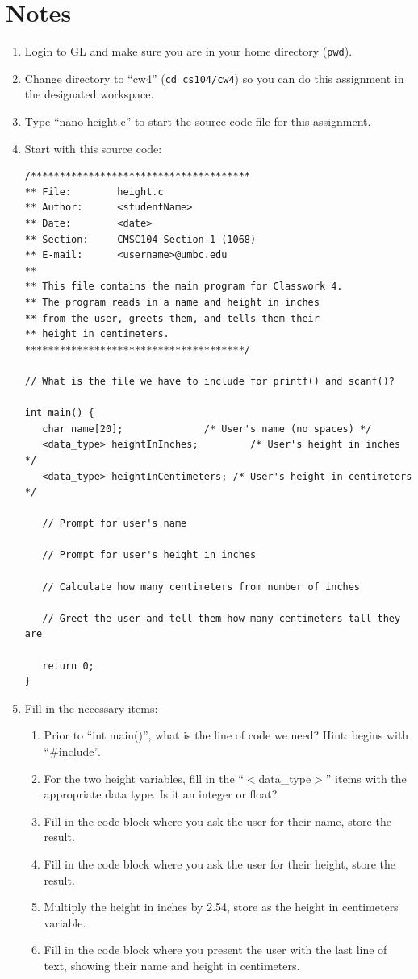 \documentclass[letter,11pt]{article}
\begin{document}
\section*{Notes}
\begin{enumerate}
    \item Login to GL and make sure you are in your home directory (\texttt{pwd}).
    \item Change directory to ``cw4'' (\texttt{cd cs104/cw4}) so you can do this assignment in the designated workspace.
    \item Type ``nano height.c'' to start the source code file for this assignment.
    \item Start with this source code: 
    \begin{verbatim}
/**************************************
** File:        height.c
** Author:      <studentName>
** Date:        <date>
** Section:     CMSC104 Section 1 (1068)
** E-mail:      <username>@umbc.edu
**
** This file contains the main program for Classwork 4.
** The program reads in a name and height in inches
** from the user, greets them, and tells them their
** height in centimeters.
**************************************/

// What is the file we have to include for printf() and scanf()?

int main() {
   char name[20];              /* User's name (no spaces) */
   <data_type> heightInInches;         /* User's height in inches */
   <data_type> heightInCentimeters; /* User's height in centimeters */

   // Prompt for user's name

   // Prompt for user's height in inches

   // Calculate how many centimeters from number of inches

   // Greet the user and tell them how many centimeters tall they are

   return 0;
}
    \end{verbatim}
    \item Fill in the necessary items:
    \begin{enumerate}
        \item Prior to ``int main()'', what is the line of code we need? Hint: begins with ``\#include''.
        \item For the two height variables, fill in the ``$<$data\_type$>$'' items with the appropriate data type. Is it an integer or float?
        \item Fill in the code block where you ask the user for their name, store the result.
        \item Fill in the code block where you ask the user for their height, store the result.
        \item Multiply the height in inches by 2.54, store as the height in centimeters variable.
        \item Fill in the code block where you present the user with the last line of text, showing their name and height in centimeters.
    \end{enumerate}
\end{enumerate}
\end{document}
